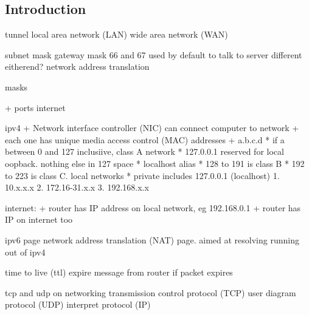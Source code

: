 
\subsection{Introduction}

tunnel
local area network (LAN)
wide area network (WAN)


subnet mask
gateway mask
66 and 67 used by default to talk to server
different eitherend?
network address translation

masks

+ ports internet

ipv4
+ Network interface controller (NIC) can connect computer to network
+ each one has unique media access control (MAC) addresses
+ a.b.c.d
  * if a between 0 and 127 inclusiive, class A network
  * 127.0.0.1 reserved for local oopback. nothing else in 127 space
  * localhost alias
  * 128 to 191 is class B
  * 192 to 223 is class C. local networks
  * private includes 127.0.0.1 (localhost)
    1. 10.x.x.x
    2. 172.16-31.x.x
    3. 192.168.x.x

internet:
+ router has IP address on local network, eg 192.168.0.1
+ router has IP on internet too

ipv6 page
network address translation (NAT) page. aimed at resolving running out of ipv4


time to live (ttl) expire message from router if packet expires

tcp and udp on networking
transmission control protocol (TCP)
user diagram protocol (UDP)
interpret protocol (IP)
